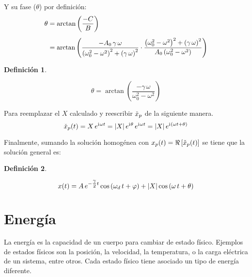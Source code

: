 \documentclass[a5paper,12pt,twoside]{book}
\newtheorem{defn}{{Definición}}[chapter]
\begin{document}
Y su fase ($\theta$) por definición:
\begin{align*}
    \theta &= \arctan \left( \frac{-C}{B} \right)
    \\[1ex]
    &=
    \scale{0.97}{
    \arctan \left( \frac{-A_0 \, \gamma \, \omega}{\left( \omega_0^2 - \omega^2 \right)^2 + \left( \gamma \, \omega \right)^2} \cdot \frac{\left( \omega_0^2 - \omega^2 \right)^2 + \left( \gamma \, \omega \right)^2}{A_0 \left( \omega_0^2 - \omega^2 \right)} \right)
    }
\end{align*}

\begin{mdframed}[style=MyFrame1]
    \begin{defn}
    \end{defn}
    \begin{equation*}
        \theta = \arctan \left( \frac{-\gamma \, \omega}{\omega_0^2 - \omega^2} \right)
    \end{equation*}
\end{mdframed}

Para reemplazar el $X$ calculado y reescribir $\check{x}_p$ de la siguiente manera.
\[
    \check{x}_p(t) = X \, e^{\mathrm{i}\mkern1mu \omega t} = {\left| {X} \right|} \, e^{\mathrm{i}\mkern1mu \theta} \, e^{\mathrm{i}\mkern1mu \omega t} = {\left| {X} \right|} \, e^{\mathrm{i}\mkern1mu \left(\omega t + \theta \right)}
\]

Finalmente, sumando la solución homogénea con $x_p(t) = \Re \left[ \check{x}_p(t) \right]$ se tiene que la solución general es:

\begin{mdframed}[style=MyFrame1]
    \begin{defn}
    \end{defn}
    \begin{equation*}
        x(t) = A \, e^{-\tfrac{\gamma}{2} t} \cos \left( \omega_d \, t + \varphi \right) + {\left| {X} \right|} \cos \left( \omega \, t + \theta \right)
    \end{equation*}
\end{mdframed}


\chapter{Energía}

La energía es la capacidad de un cuerpo para cambiar de estado físico.
Ejemplos de estados físicos son la posición, la velocidad, la temperatura, o la carga eléctrica de un sistema, entre otros.
Cada estado físico tiene asociado un tipo de energía diferente.
\end{document}
